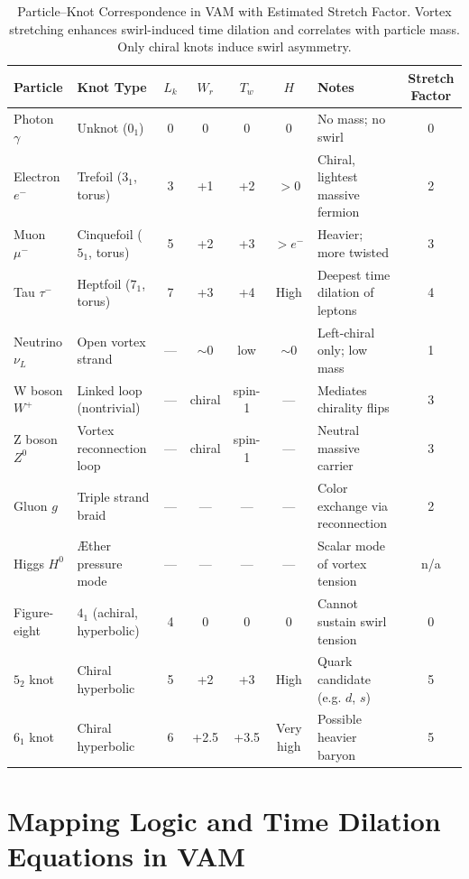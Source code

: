\documentclass[11pt]{article}
\begin{document}
\begin{table}[H]
\centering
\scriptsize
\begin{tabular}{|l|l|c|c|c|c|l|c|}
\hline
\textbf{Particle} & \textbf{Knot Type} & $L_k$ & $W_r$ & $T_w$ & $H$ & \textbf{Notes} & \textbf{Stretch Factor} \\
\hline
Photon $\gamma$ & Unknot ($0_1$) & 0 & 0 & 0 & 0 & No mass; no swirl & 0 \\
Electron $e^-$ & Trefoil ($3_1$, torus) & 3 & +1 & +2 & $>0$ & Chiral, lightest massive fermion & 2 \\
Muon $\mu^-$ & Cinquefoil ($5_1$, torus) & 5 & +2 & +3 & $>\!e^-$ & Heavier; more twisted & 3 \\
Tau $\tau^-$ & Heptfoil ($7_1$, torus) & 7 & +3 & +4 & High & Deepest time dilation of leptons & 4 \\
Neutrino $\nu_L$ & Open vortex strand & — & $\sim$0 & low & $\sim$0 & Left-chiral only; low mass & 1 \\
W boson $W^+$ & Linked loop (nontrivial) & — & chiral & spin-1 & — & Mediates chirality flips & 3 \\
Z boson $Z^0$ & Vortex reconnection loop & — & chiral & spin-1 & — & Neutral massive carrier & 3 \\
Gluon $g$ & Triple strand braid & — & — & — & — & Color exchange via reconnection & 2 \\
Higgs $H^0$ & Æther pressure mode & — & — & — & — & Scalar mode of vortex tension & n/a \\
Figure-eight & $4_1$ (achiral, hyperbolic) & 4 & 0 & 0 & 0 & Cannot sustain swirl tension & 0 \\
$5_2$ knot & Chiral hyperbolic & 5 & +2 & +3 & High & Quark candidate (e.g. $d$, $s$) & 5 \\
$6_1$ knot & Chiral hyperbolic & 6 & +2.5 & +3.5 & Very high & Possible heavier baryon & 5 \\
\hline
\end{tabular}
\caption{Particle–Knot Correspondence in VAM with Estimated Stretch Factor. Vortex stretching enhances swirl-induced time dilation and correlates with particle mass. Only chiral knots induce swirl asymmetry.}
\label{tab:stretch-factor}
\end{table}



\section*{Mapping Logic and Time Dilation Equations in VAM}
\end{document}
